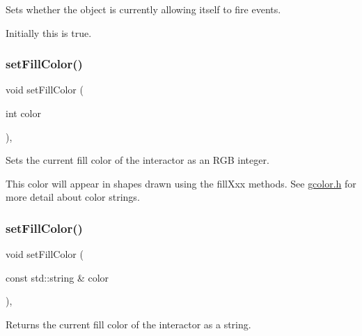 Sets whether the object is currently allowing itself to fire events. 

Initially this is true. \mbox{\label{classsgl_1_1GDrawingSurface_a47fad447b715f2f303538434eed26709}} 
\subsubsection{\texorpdfstring{set\+Fill\+Color()}{setFillColor()}\hspace{0.1cm}{\footnotesize\ttfamily [1/2]}}
{\footnotesize\ttfamily void set\+Fill\+Color (\begin{DoxyParamCaption}\item[{int}]{color }\end{DoxyParamCaption})\hspace{0.3cm}{\ttfamily [virtual]}, {\ttfamily [inherited]}}



Sets the current fill color of the interactor as an R\+GB integer. 

This color will appear in shapes drawn using the fill\+Xxx methods. See \mbox{\hyperlink{gcolor_8h_source}{gcolor.\+h}} for more detail about color strings. \mbox{\label{classsgl_1_1GDrawingSurface_adbc18b1a930aadd97d7437f9f7265b96}} 
\subsubsection{\texorpdfstring{set\+Fill\+Color()}{setFillColor()}\hspace{0.1cm}{\footnotesize\ttfamily [2/2]}}
{\footnotesize\ttfamily void set\+Fill\+Color (\begin{DoxyParamCaption}\item[{const std\+::string \&}]{color }\end{DoxyParamCaption})\hspace{0.3cm}{\ttfamily [virtual]}, {\ttfamily [inherited]}}



Returns the current fill color of the interactor as a string. 

